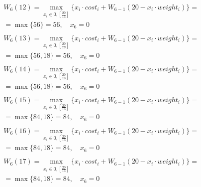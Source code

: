 \documentclass[17pt]{extarticle}
\begin{document}
\[
    \begin{aligned}
         & W_6(12)=\max_{x_i \in \overline{0, \left[\frac{20}{13}\right]}} \{x_i \cdot cost_i + W_{6-1}(20 - x_i \cdot weight_i)\}= \\& = \max \{
        56\}= 56, \quad x_6 = 0                                                                                                     \\
    \end{aligned}
\]
\[
    \begin{aligned}
         & W_6(13)=\max_{x_i \in \overline{0, \left[\frac{20}{13}\right]}} \{x_i \cdot cost_i + W_{6-1}(20 - x_i \cdot weight_i)\}= \\& = \max \{
        56, 18\}= 56, \quad x_6 = 0                                                                                                 \\
    \end{aligned}
\]
\[
    \begin{aligned}
         & W_6(14)=\max_{x_i \in \overline{0, \left[\frac{20}{13}\right]}} \{x_i \cdot cost_i + W_{6-1}(20 - x_i \cdot weight_i)\}= \\& = \max \{
        56, 18\}= 56, \quad x_6 = 0                                                                                                 \\
    \end{aligned}
\]
\[
    \begin{aligned}
         & W_6(15)=\max_{x_i \in \overline{0, \left[\frac{20}{13}\right]}} \{x_i \cdot cost_i + W_{6-1}(20 - x_i \cdot weight_i)\}= \\& = \max \{
        84, 18\}= 84, \quad x_6 = 0                                                                                                 \\
    \end{aligned}
\]
\[
    \begin{aligned}
         & W_6(16)=\max_{x_i \in \overline{0, \left[\frac{20}{13}\right]}} \{x_i \cdot cost_i + W_{6-1}(20 - x_i \cdot weight_i)\}= \\& = \max \{
        84, 18\}= 84, \quad x_6 = 0                                                                                                 \\
    \end{aligned}
\]
\[
    \begin{aligned}
         & W_6(17)=\max_{x_i \in \overline{0, \left[\frac{20}{13}\right]}} \{x_i \cdot cost_i + W_{6-1}(20 - x_i \cdot weight_i)\}= \\& = \max \{
        84, 18\}= 84, \quad x_6 = 0                                                                                                 \\
    \end{aligned}
\]
\end{document}

